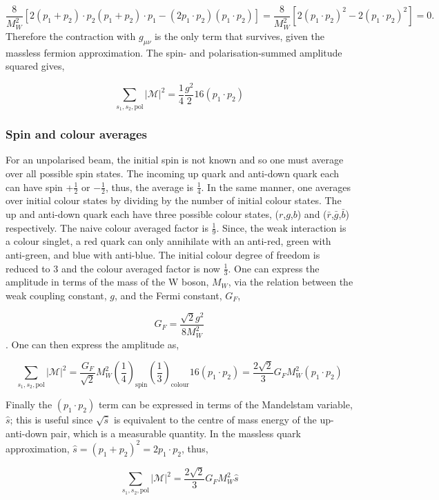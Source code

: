\documentclass[a4paper,11pt]{article}
\begin{document}
$$\frac{8}{M_W^2}[2(p_1 + p_2) \cdot p_2 (p_1 +p_2 )\cdot p_1 - (2p_1\cdot p_2)(p_1 \cdot p_2)]  = \frac{8}{M_W^2}[2(p_1 \cdot p_2)^2 - 2(p_1 \cdot p_2)^2] = 0.$$	
Therefore the contraction with $g_{\mu\nu}$ is the only term that survives, given the massless fermion approximation. The spin- and  polarisation-summed amplitude squared gives,


\begin{equation}\label{spin_pol_square_amp2}
	\sum_{s_1, s_2, \text{pol}} |\mathcal{M}|^2= \frac{1}{4} \frac{g^2}{2}16(p_1 \cdot p_2)
\end{equation}

\subsubsection{Spin and colour averages}
For an unpolarised beam, the initial spin is not known and so one must average over all possible spin states. The incoming up quark and anti-down quark each can have spin +$\frac{1}{2}$ or $-\frac{1}{2}$, thus, the average is $\frac{1}{4}$. In the same manner, one averages over initial colour states by dividing by the number of initial colour states.  The up and anti-down quark each have three possible colour states, ($r$,$g$,$b$) and ($\bar{r}$,$\bar{g}$,$\bar{b}$) respectively. The naive colour averaged factor is $\frac{1}{9}$. Since, the weak interaction is a colour singlet, a red quark can only annihilate with an anti-red, green with anti-green, and blue with anti-blue. The initial colour degree of freedom is reduced to 3 and the colour averaged factor is now $\frac{1}{3}$. One can express the amplitude in terms of the mass of the W boson, $M_W$, via the relation between the weak coupling constant, $g$, and the Fermi constant, $G_F$,

$$G_F = \frac{\sqrt{2} g^2}{8M_W^2}$$. One can then express the amplitude as,


$$\sum_{s_1, s_2, \text{pol}} |\mathcal{M}|^2=  \frac{G_F}{\sqrt{2}} M_W^2 \left(\frac{1}{4}\right)_{\text{spin}}\left(\frac{1}{3}\right)_{\text{colour}}16(p_1 \cdot p_2)  =  \frac{2\sqrt{2}}{3}G_F M_W^2	(p_1 \cdot p_2) $$

Finally the $(p_1 \cdot p_2)$ term can be expressed in terms of the Mandelstam variable, $\hat{s}$; this is useful since $\sqrt{\hat{s}}$ is equivalent to the centre of mass energy of the up-anti-down pair, which is a measurable quantity. In the massless quark approximation,  $\hat{s} = (p_1+p_2)^2 = 2p_1 \cdot p_2$, thus, 

\begin{equation}\label{amp}
	\sum_{s_1, s_2, \text{pol}} |\mathcal{M}|^2= \frac{2\sqrt{2}}{3}G_F M_W^2 \hat{s}
\end{equation}
\end{document}
